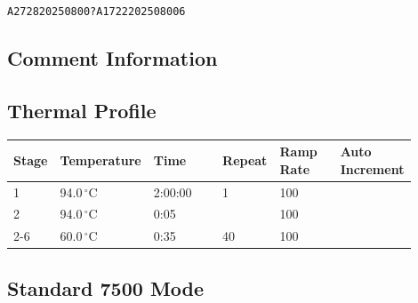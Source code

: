 \documentclass[UTF8,10pt,a4paper,fontset=fandol]{ctexart}
\newcommand{\fieldvalue}[1]{#1}
\begin{document}
\fieldvalue{\texttt{A272820250800?A1722202508006}}

\subsection{Comment Information}


\subsection{Thermal Profile}

\begin{center}
\small
\begin{tabular}{|p{0.10\linewidth}|p{0.17\linewidth}|p{0.17\linewidth}|p{0.13\linewidth}|p{0.15\linewidth}|p{0.18\linewidth}|}
\hline
\textbf{Stage} & \textbf{Temperature} & \textbf{Time} & \textbf{Repeat} & \textbf{Ramp Rate} & \textbf{Auto Increment} \\
\hline
\fieldvalue{1}
&
\fieldvalue{94.0\,${}^{\circ}$C}
&
\fieldvalue{2:00:00}
&
\fieldvalue{1}
&
\fieldvalue{100}
&
\\
\hline
\fieldvalue{2}
&
\fieldvalue{94.0\,${}^{\circ}$C}
&
\fieldvalue{0:05}
&
&
\fieldvalue{100}
&
\\
\cline{2-6}
&
\fieldvalue{60.0\,${}^{\circ}$C}
&
\fieldvalue{0:35}
&
\fieldvalue{40}
&
\fieldvalue{100}
&
\\
\hline
\end{tabular}
\end{center}

\subsection{Standard 7500 Mode}
\end{document}
